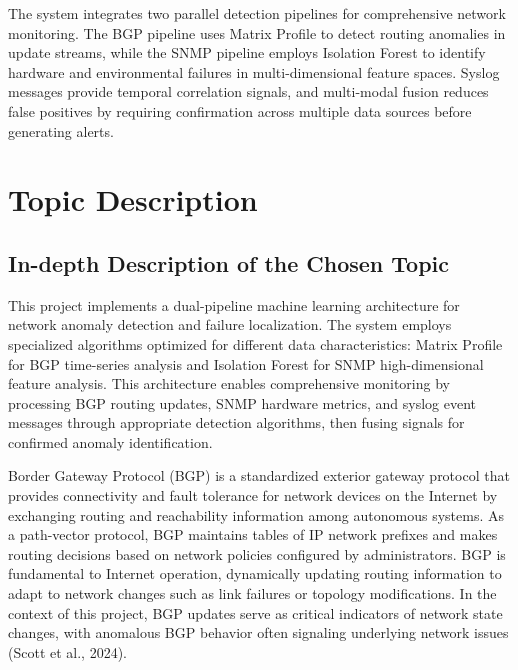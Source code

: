 \documentclass[11pt]{article}
\begin{document}
The system integrates two parallel detection pipelines for comprehensive network monitoring. The BGP pipeline uses Matrix Profile to detect routing anomalies in update streams, while the SNMP pipeline employs Isolation Forest to identify hardware and environmental failures in multi-dimensional feature spaces. Syslog messages provide temporal correlation signals, and multi-modal fusion reduces false positives by requiring confirmation across multiple data sources before generating alerts.

\section{Topic Description}

\subsection{In-depth Description of the Chosen Topic}

This project implements a dual-pipeline machine learning architecture for network anomaly detection and failure localization. The system employs specialized algorithms optimized for different data characteristics: Matrix Profile for BGP time-series analysis and Isolation Forest for SNMP high-dimensional feature analysis. This architecture enables comprehensive monitoring by processing BGP routing updates, SNMP hardware metrics, and syslog event messages through appropriate detection algorithms, then fusing signals for confirmed anomaly identification.

Border Gateway Protocol (BGP) is a standardized exterior gateway protocol that provides connectivity and fault tolerance for network devices on the Internet by exchanging routing and reachability information among autonomous systems. As a path-vector protocol, BGP maintains tables of IP network prefixes and makes routing decisions based on network policies configured by administrators. BGP is fundamental to Internet operation, dynamically updating routing information to adapt to network changes such as link failures or topology modifications. In the context of this project, BGP updates serve as critical indicators of network state changes, with anomalous BGP behavior often signaling underlying network issues (Scott et al., 2024).
\end{document}
